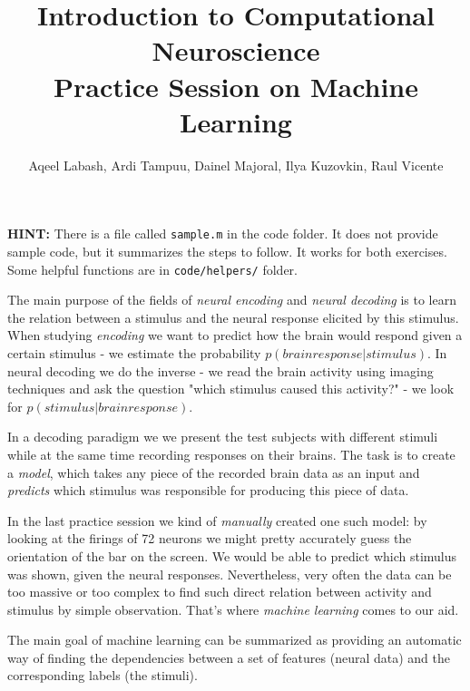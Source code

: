 \documentclass[a4paper,11pt]{article}
\author{\large{Aqeel Labash, Ardi Tampuu, Dainel Majoral, Ilya Kuzovkin, Raul Vicente}}
\title{\huge{Introduction to Computational Neuroscience}\\\LARGE{Practice Session on Machine Learning}}
\begin{document}
\maketitle

\textbf{HINT: } There is a file called \texttt{sample.m} in the code folder. It does not provide sample code, but it summarizes the steps to follow. It works for both exercises. Some helpful functions are in \texttt{code/helpers/} folder.

\vspace{0.8cm}
%
%
The main purpose of the fields of \emph{neural encoding} and \emph{neural decoding} is to learn the relation between a stimulus and the neural response elicited by this stimulus. When studying \emph{encoding} we want to predict how the brain would respond given a certain stimulus - we estimate the probability $p(brain response | stimulus)$. In neural decoding we do the inverse - we read the brain activity using imaging techniques and ask the question "which stimulus caused this activity?" - we look for $p(stimulus | brain response)$. 

In a decoding paradigm we we present the test subjects with different stimuli while at the same time recording responses on their brains. The task is to create a \emph{model}, which takes any piece of the recorded brain data as an input and \emph{predicts} which stimulus was responsible for producing this piece of data.

In the last practice session we kind of \emph{manually} created one such model: by looking at the firings of 72 neurons we might pretty accurately guess the orientation of the bar on the screen. We would be able to predict which stimulus was shown, given the neural responses. Nevertheless, very often the data can be too massive or too complex to find such direct relation between activity and stimulus by simple observation. That's where \emph{machine learning} comes to our aid.

The main goal of machine learning can be summarized as providing an automatic way of finding the dependencies between a set of features (neural data) and the corresponding labels (the stimuli).\\
\end{document}

